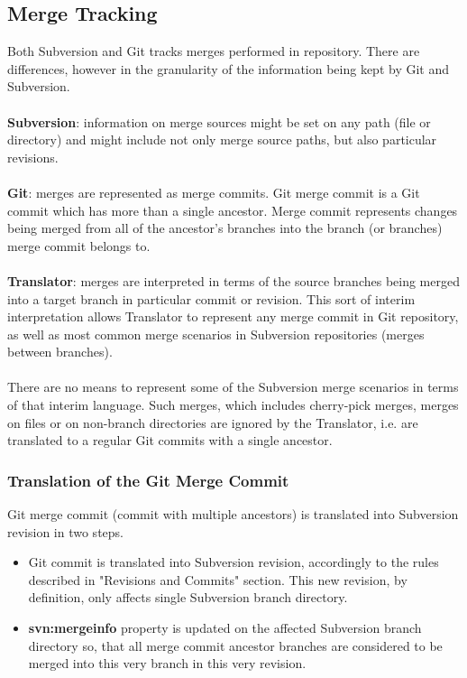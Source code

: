 \renewcommand{\figurename}{Diagram}
\subsection{Merge Tracking}

Both Subversion and Git tracks merges performed in repository. There are differences, however in 
the granularity of the information being kept by Git and Subversion.
\\\\
\textbf{Subversion}: information on merge sources might be set on any path (file or directory) and might include not only
merge source paths, but also particular revisions.
\\\\
\textbf{Git}: merges are represented as merge commits. Git merge commit is a Git commit which has more than a single 
ancestor. Merge commit represents changes being merged from all of the ancestor's branches into the branch (or branches)
merge commit belongs to.
\\\\
\textbf{Translator}: merges are interpreted in terms of the source branches being merged into a 
target branch in particular commit or revision. This sort of interim interpretation allows Translator
to represent any merge commit in Git repository, as well as most common merge scenarios in Subversion repositories (merges
between branches).
\\\\
There are no means to represent some of the Subversion merge scenarios in terms of that interim language.
Such merges, which includes cherry-pick merges, merges on files or on non-branch directories are ignored by the Translator,
i.e. are translated to a regular Git commits with a single ancestor.

\subsubsection{Translation of the Git Merge Commit}

Git merge commit (commit with multiple ancestors) is translated into Subversion revision in two steps.
\begin{itemize}
\item Git commit is translated into Subversion revision, accordingly to the rules described in "Revisions and Commits" section.
This new revision, by definition, only affects single Subversion branch directory.
\item \textbf{svn:mergeinfo} property is updated on the affected Subversion branch directory so, that all merge
commit ancestor branches are considered to be merged into this very branch in this very revision.
\end{itemize}

